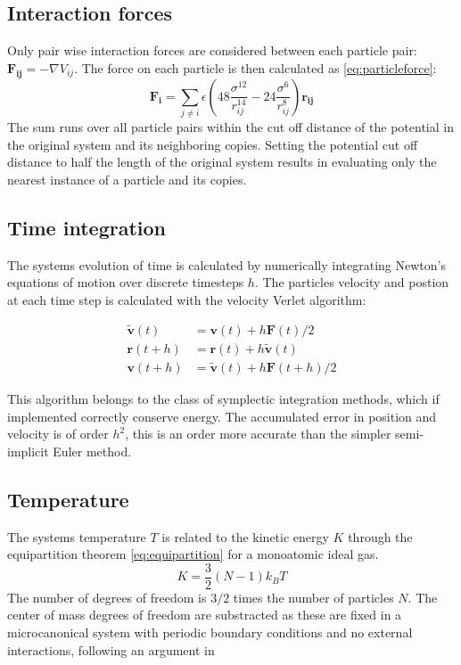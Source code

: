 \documentclass[
10pt, %
a4paper, %
oneside, %
headinclude,footinclude, %
BCOR5mm, %
]{scrartcl}
\begin{document}
\subsection{Interaction forces}
Only pair wise interaction forces are considered between each particle pair: $\mathbf{F_{ij}} = - \nabla V_{ij}$. The force on each particle is then calculated as \ref{eq:particleforce}:
\begin{equation}
\mathbf{F_{i}} = \sum_{j \neq i} \epsilon \left ( 48 \frac{\sigma^{12}}{r_{ij}^{14}} - 24 \frac{\sigma^6}{r_{ij}^8} \right ) \mathbf{r_{ij}} 
\label{eq:particleforce}
\end{equation}
The sum runs over all particle pairs within the cut off distance of the potential in the original system and its neighboring copies.
Setting the potential cut off distance to half the length of the original system results in evaluating only the nearest instance of a particle and its copies.

\subsection{Time integration}
The systems evolution of time is calculated by numerically integrating Newton's equations of motion over discrete timesteps $h$. The particles velocity and postion at each time step is calculated with the velocity Verlet algorithm: 

\begin{align}
\tilde{\mathbf{v}}(t) &=  \mathbf{v}(t) + h \mathbf{F}(t)/2 \\
\mathbf{r}(t+h) &= \mathbf{r}(t) + h\tilde{\mathbf{v}}(t) \\
\mathbf{v}(t+h) &= \tilde{\mathbf{v}}(t) + h \mathbf{F}(t+h)/2 
\end{align}

This algorithm belongs to the class of symplectic integration methods, which if implemented correctly conserve energy. The accumulated error in position and velocity is of order $h^2$, this is an order more accurate than the simpler semi-implicit Euler method.

\subsection{Temperature}

The systems temperature $T$ is related to the kinetic energy $K$ through the equipartition theorem \ref{eq:equipartition} for a monoatomic ideal gas. 
 \begin{equation} 
 \label{eq:equipartition}
 K = \frac{3}{2} (N - 1) k_B T
 \end{equation}
The number of degrees of freedom is $3/2$ times the number of particles $N$. The center of mass degrees of freedom are substracted as these are fixed in a microcanonical system with periodic boundary conditions and no external interactions, following an argument in \cite{Thijssen:2013cp}
\end{document}
